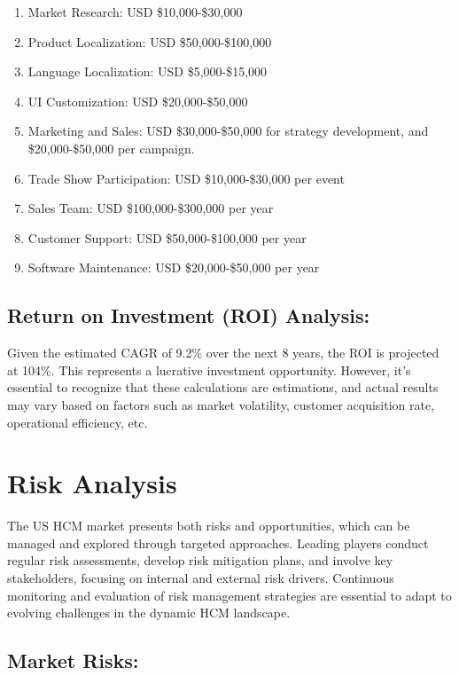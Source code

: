 \documentclass[
  a4paper,
]{book}
\providecommand{\tightlist}{%
  \setlength{\itemsep}{0pt}\setlength{\parskip}{0pt}}\usepackage{longtable,booktabs,array}
\renewcommand{\labelenumi}{\textbf{\textcolor{com-color}{\arabic*.}}}%
\begin{document}
\begin{enumerate}
\def\labelenumi{\arabic{enumi}.}
\tightlist
\item
  Market Research: USD \$10,000-\$30,000
\item
  Product Localization: USD \$50,000-\$100,000
\item
  Language Localization: USD \$5,000-\$15,000
\item
  UI Customization: USD \$20,000-\$50,000
\item
  Marketing and Sales: USD \$30,000-\$50,000 for strategy development,
  and \$20,000-\$50,000 per campaign.
\item
  Trade Show Participation: USD \$10,000-\$30,000 per event
\item
  Sales Team: USD \$100,000-\$300,000 per year
\item
  Customer Support: USD \$50,000-\$100,000 per year
\item
  Software Maintenance: USD \$20,000-\$50,000 per year
\end{enumerate}

\hypertarget{return-on-investment-roi-analysis}{%
\subsection{Return on Investment (ROI)
Analysis:}\label{return-on-investment-roi-analysis}}

Given the estimated CAGR of 9.2\% over the next 8 years, the ROI is
projected at 104\%. This represents a lucrative investment opportunity.
However, it's essential to recognize that these calculations are
estimations, and actual results may vary based on factors such as market
volatility, customer acquisition rate, operational efficiency, etc.

\hypertarget{risk-analysis}{%
\section{Risk Analysis}\label{risk-analysis}}

The US HCM market presents both risks and opportunities, which can be
managed and explored through targeted approaches. Leading players
conduct regular risk assessments, develop risk mitigation plans, and
involve key stakeholders, focusing on internal and external risk
drivers. Continuous monitoring and evaluation of risk management
strategies are essential to adapt to evolving challenges in the dynamic
HCM landscape.

\hypertarget{market-risks}{%
\subsection{Market Risks:}\label{market-risks}}
\end{document}
